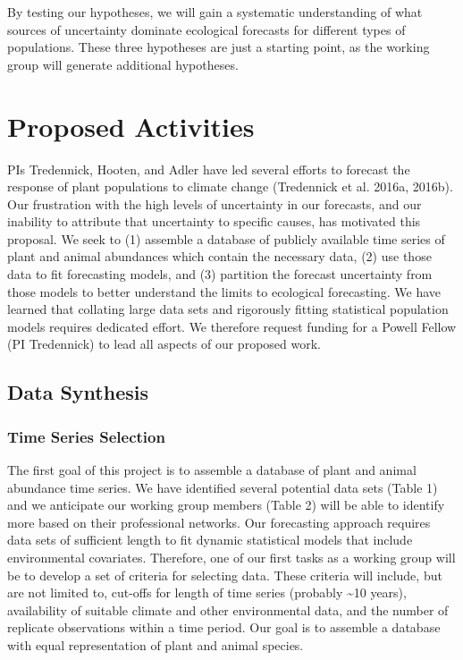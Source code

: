 \documentclass[12pt,]{article}
\begin{document}
By testing our hypotheses, we will gain a systematic understanding of
what sources of uncertainty dominate ecological forecasts for different
types of populations. These three hypotheses are just a starting point,
as the working group will generate additional hypotheses.

\section{Proposed Activities}

PIs Tredennick, Hooten, and Adler have led several efforts to forecast
the response of plant populations to climate change (Tredennick et al.
2016a, 2016b). Our frustration with the high levels of uncertainty in
our forecasts, and our inability to attribute that uncertainty to
specific causes, has motivated this proposal. We seek to (1) assemble a
database of publicly available time series of plant and animal
abundances which contain the necessary data, (2) use those data to fit
forecasting models, and (3) partition the forecast uncertainty from
those models to better understand the limits to ecological forecasting.
We have learned that collating large data sets and rigorously fitting
statistical population models requires dedicated effort. We therefore
request funding for a Powell Fellow (PI Tredennick) to lead all aspects
of our proposed work.

\subsection{Data Synthesis}\subsubsection{Time Series Selection}

The first goal of this project is to assemble a database of plant and
animal abundance time series. We have identified several potential data
sets (Table 1) and we anticipate our working group members (Table 2)
will be able to identify more based on their professional networks. Our
forecasting approach requires data sets of sufficient length to fit
dynamic statistical models that include environmental covariates.
Therefore, one of our first tasks as a working group will be to develop
a set of criteria for selecting data. These criteria will include, but
are not limited to, cut-offs for length of time series (probably
\textasciitilde{}10 years), availability of suitable climate and other
environmental data, and the number of replicate observations within a
time period. Our goal is to assemble a database with equal
representation of plant and animal species.
\end{document}
